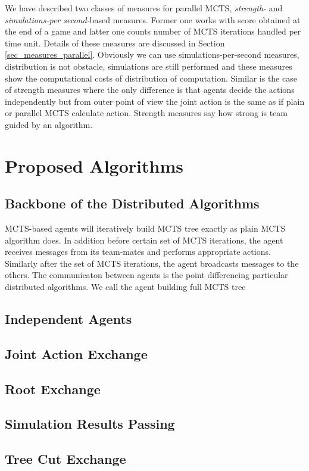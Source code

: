 We have described two classes of measures for parallel MCTS, \emph{strength-} and
\emph{simulations-per second-}based measures. Former one works with score obtained at the end
of a game and latter one counts number of MCTS iterations handled per time unit. Details of
these measures are discussed in Section \ref{sec_measures_parallel}. Obviously we can use
simulations-per-second measures, distribution is not obstacle, simulations are still performed
and these measures show the computational costs of distribution of computation. Similar is the
case of strength measures where the only difference is that agents decide the actions
independently but from outer point of view the joint action is the same as if plain or parallel
MCTS calculate action. Strength measures say how strong is team guided by an algorithm.

\section{Proposed Algorithms}


\subsection{Backbone of the Distributed Algorithms}
\label{sec_dmcts_common}

MCTS-based agents will iteratively build MCTS tree exactly as plain MCTS algorithm does. In
addition before certain set of MCTS iterations, the agent receives messages from its team-mates
and performs appropriate actions. Similarly after the set of MCTS iterations, the agent
broadcasts messages to the others. The communicaton between agents is the point differencing
particular distributed algorithms. We call the agent building full MCTS tree 





\subsection{Independent Agents}




\subsection{Joint Action Exchange}
\subsection{Root Exchange}
\subsection{Simulation Results Passing}
\subsection{Tree Cut Exchange}
